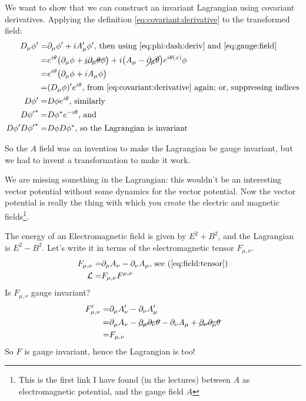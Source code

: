 \documentclass[]{article}
\begin{document}
We want to show that we can construct an invariant Lagrangian using covariant derivatives. Applying the definition \eqref{eq:covariant:derivative} to the transformed field:
\begin{align*}
	D_\mu \phi^\prime =& \partial_\mu \phi^\prime + i A_\mu^\prime \phi^\prime\text{, then using \eqref{eq:phi:dash:deriv} and  \eqref{eq:gauge:field}}\\
	=& e^{i\theta}\big(\partial_\mu \phi +\cancel{i\partial_\mu \theta \phi} \big) + i \big(A_\mu -\cancel{ \partial_\mu \theta} \big) e^{i \theta(x)} \phi\\
	=& e^{i\theta} \big( \partial_\mu \phi +i A_\mu \phi \big)\\
	=& (D_\mu \phi)^\prime e^{i\theta} \text{, from \eqref{eq:covariant:derivative} again; or, suppressing indices}\\
	D \phi^\prime =&  D \phi  e^{i \theta} \text{, similarly}\\
	D {\phi^\prime}^* =& D {\phi}^*  e^{-i \theta} \text{, and}\\
	D \phi^\prime D {\phi^\prime}^*=& D \phi D {\phi}^* \text{, so the Lagrangian is invariant}
\end{align*}

So the $A$ field was an invention to make the Lagrangian be gauge invariant, but we had to invent a transformation to make it work.

We are missing something in the Lagrangian: this wouldn't be an interesting vector potential without some dynamics for the vector potential. Now the vector potential is really the thing with which you create the electric and magnetic fields\footnote{This is the first link I have found (in the lectures) between $A$ as electromagnetic potential, and the gauge field $A$}.

The energy of an Electromagnetic field is given by $E^2 + B^2$, and the Lagrangian is $E^2-B^2$. Let's write it in terms of the electromagnetic tensor $F_{\mu,\nu}$.
\begin{align*} 
	F_{\mu,\nu} =& \partial_\mu A_\nu - \partial_\nu A_\mu \text{, see (\ref{eq:field:tensor})}\\
	\mathcal{L} =& F_{\mu,\nu} F^{\mu,\nu} 
\end{align*}
Is $F_{\mu,\nu}$ gauge invariant?
\begin{align*}
	F_{\mu,\nu}^\prime =&\partial_\mu A_\nu^\prime - \partial_\nu A_\mu^\prime\\
	=& \partial_\mu A_\nu - \cancel{\partial_\mu \partial_\nu \theta}-\partial_\nu A_\mu + \cancel{\partial_\nu \partial_\mu \theta}\\
	=& 	F_{\mu,\nu}
\end{align*}
So $F$ is gauge invariant, hence the Lagrangian is too!
\end{document}
